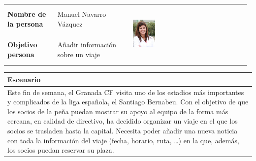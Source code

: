 \documentclass[11pt]{article}
\begin{document}
\begin{table}[H]
  \centering
  \begin{tabular}{p{0.2\linewidth}|p{0.3\linewidth}p{0.475\linewidth}}
    \toprule
    \textbf{Nombre de la persona} & Manuel Navarro Vázquez &\multirow{2}{*}{\begin{minipage}{1.\textwidth}\includegraphics[width=0.2\textwidth, height=30mm]{Ana}\end{minipage}}\\
    \textbf{Objetivo persona} & Añadir información sobre un viaje & \\
    \bottomrule
  \end{tabular}

\begin{tabular}{p{1.028\linewidth}}
  \textbf{Escenario}\\
  \midrule
  Este fin de semana, el Granada CF visita uno de los estadios más importantes y complicados de la liga española, el Santiago Bernabeu. Con el objetivo de que los socios de la peña puedan mostrar su apoyo al equipo de la forma más cercana, en calidad de directivo, ha decidido organizar un viaje en el que los socios se trasladen hasta la capital. Necesita poder añadir una nueva noticia con toda la información del viaje (fecha, horario, ruta, \dots) en la que, además, los socios puedan reservar su plaza.
\end{tabular}
\end{table}
\end{document}
